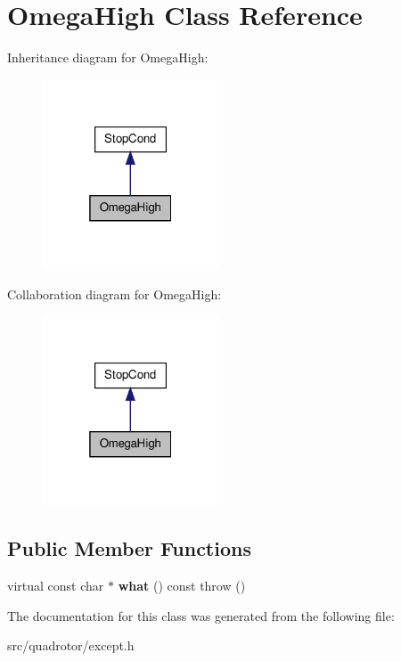 \hypertarget{classOmegaHigh}{\section{\-Omega\-High \-Class \-Reference}
\label{classOmegaHigh}
}


\-Inheritance diagram for \-Omega\-High\-:\nopagebreak
\begin{figure}[H]
\begin{center}
\leavevmode
\includegraphics[width=148pt]{classOmegaHigh__inherit__graph}
\end{center}
\end{figure}


\-Collaboration diagram for \-Omega\-High\-:\nopagebreak
\begin{figure}[H]
\begin{center}
\leavevmode
\includegraphics[width=148pt]{classOmegaHigh__coll__graph}
\end{center}
\end{figure}
\subsection*{\-Public \-Member \-Functions}
\begin{DoxyCompactItemize}
\item 
\hypertarget{classOmegaHigh_a9b61b9efec3c6adf95be4db650903c81}{virtual const char $\ast$ {\bfseries what} () const   throw ()}\label{classOmegaHigh_a9b61b9efec3c6adf95be4db650903c81}

\end{DoxyCompactItemize}


\-The documentation for this class was generated from the following file\-:\begin{DoxyCompactItemize}
\item 
src/quadrotor/except.\-h\end{DoxyCompactItemize}
